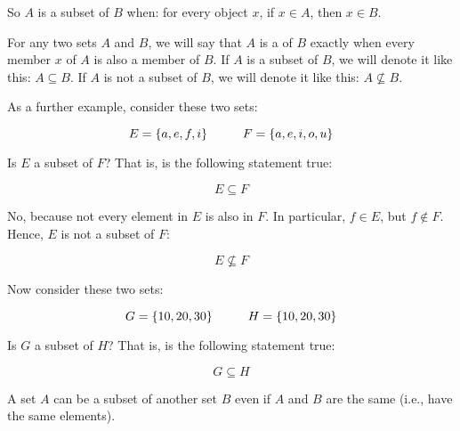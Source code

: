 \documentclass[../../../main.tex]{subfiles}
\begin{document}
\begin{aside}
  \begin{notation}
    So $A$ is a subset of $B$ when: for every object $x$, if $x \in A$, then $x \in B$.
  \end{notation}
\end{aside}

\begin{fdefinition}[Subsets]
  \label{def:subset}
  For any two sets $A$ and $B$, we will say that $A$ is a  of $B$ exactly when every member $x$ of $A$ is also a member of $B$. If $A$ is a subset of $B$, we will denote it like this: $A \subseteq B$. If $A$ is not a subset of $B$, we will denote it like this: $A \not \subseteq B$.
\end{fdefinition}

As a further example, consider these two sets:

\begin{equation*}
  E = \{ a, e, f, i \} \hskip 1cm F = \{ a, e, i, o, u \}
\end{equation*}

Is $E$ a subset of $F$? That is, is the following statement true:

\begin{equation*}
  E \subseteq F
\end{equation*}

No, because not every element in $E$ is also in $F$. In particular, $f \in E$, but $f \not \in F$. Hence, $E$ is not a subset of $F$:

\begin{equation*}
  E \not \subseteq F
\end{equation*}

Now consider these two sets:

\begin{equation*}
  G = \{ 10, 20, 30 \} \hskip 1cm H = \{ 10, 20, 30 \}
\end{equation*}

Is $G$ a subset of $H$? That is, is the following statement true:

\begin{equation*}
  G \subseteq H
\end{equation*}

\begin{aside}
  \begin{remark}
    A set $A$ can be a subset of another set $B$ even if $A$ and $B$ are the same (i.e., have the same elements).
  \end{remark}
\end{aside}
\end{document}
